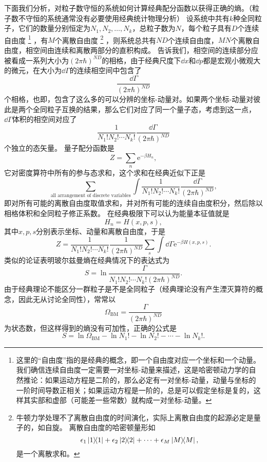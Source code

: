 \documentclass[hyperref, UTF8, a4paper]{ctexart}
\newcommand*{\ee}{\mathrm{e}}
\renewcommand{\autoref}{\prettyref}
\begin{document}
下面我们分析，对粒子数守恒的系统如何计算经典配分函数以获得正确的熵。（粒子数不守恒的系统通常没有必要使用经典统计物理分析）
设系统中共有$k$种全同粒子，它们的数量分别恒定为$N_1, N_2, \ldots, N_k$，总粒子数为$N$，每个粒子具有$D$个连续自由度%
\footnote{这里的“自由度”指的是经典的概念，即一个自由度对应一个坐标和一个动量。
我们确信连续自由度一定需要一对坐标-动量来描述，这是哈密顿动力学的自然推论：如果运动方程是二阶的，那么必定有一对坐标-动量，动量与坐标的一阶时间导数正相关；如果运动方程是一阶的，总是可以假定坐标是复的，这样其实部和虚部（可能差一些常数）就构成一对坐标-动量。
}%
，有$M$个离散自由度
%
\footnote{牛顿力学处理不了离散自由度的时间演化，实际上离散自由度的起源必定是量子的，如自旋。
离散自由度的哈密顿量形如
\[
    \epsilon_1 \dyad{1} + \epsilon_2 \dyad{2} + \cdots + \epsilon_M \dyad{M},
\]
是一个离散求和。
}%
，则系统总共有$ND$个连续自由度，$MN$个离散自由度，相空间由连续和离散两部分的直积构成。
\autoref{sec:back-to-classical}告诉我们，相空间的连续部分应被看成一系列大小为$(2\pi \hbar)^{ND}$的相格，由于经典尺度下$\dd{x}$和$\dd{p}$都是宏观小微观大的微元，在大小为$\dd{\Gamma}$的连续相空间中包含了
\[
    \frac{\dd{\Gamma}}{(2\pi \hbar)^{ND}}
\]
个相格，也即，包含了这么多的可以分辨的坐标-动量对。如果两个坐标-动量对彼此是两个全同粒子互换的结果，那么它们对应了同一个量子态，考虑到这一点，$\dd{\Gamma}$体积的相空间对应了
\[
    \frac{1}{N_1! N_2! \cdots N_k!} \frac{\dd{\Gamma}}{(2\pi \hbar)^{ND}}
\]
个独立的态矢量。
量子配分函数是
\[
    Z = \sum_n \ee^{-\beta H_n},
\]
它对密度算符中所有的参与态求和，这个求和在经典近似下正是
\[
    \sum_\text{all arrangement of discrete variables} \int \frac{1}{N_1! N_2! \cdots N_k!} \frac{\dd{\Gamma}}{(2\pi \hbar)^{ND}},
\]
即对所有可能的离散自由度取值求和，并对所有可能的连续自由度积分，然后除以相格体积和全同粒子修正系数。
在经典极限下可以认为能量本征值就是
\[
    H_n = H(x, p, s),
\]
其中$x, p, s$分别表示坐标、动量和离散自由度，于是
\begin{equation}
    Z = \frac{1}{N_1! N_2! \cdots N_k!} \frac{1}{(2\pi \hbar)^{ND}} \sum_{s} \int \dd{\Gamma} \ee^{-\beta H(x, p, s)}.
\end{equation}
类似的论证表明玻尔兹曼熵在经典情况下的表达式为
\begin{equation}
    S = \ln \frac{\Gamma}{N_1! N_2! \cdots N_k! (2\pi\hbar)^{ND}}.
\end{equation}
由于经典理论不能区分一群粒子是不是全同粒子（经典理论没有产生湮灭算符的概念，因此无从讨论全同性），常常以
\begin{equation}
    \Omega_\text{BM} = \frac{\Gamma}{(2\pi\hbar)^{ND}}
\end{equation}
为状态数，但这样得到的熵没有可加性，正确的公式是
\[
    S = \ln \Omega_\text{BM} - \ln N_1! - \ln N_2! - \cdots - \ln N_k!.
\]
\end{document}
